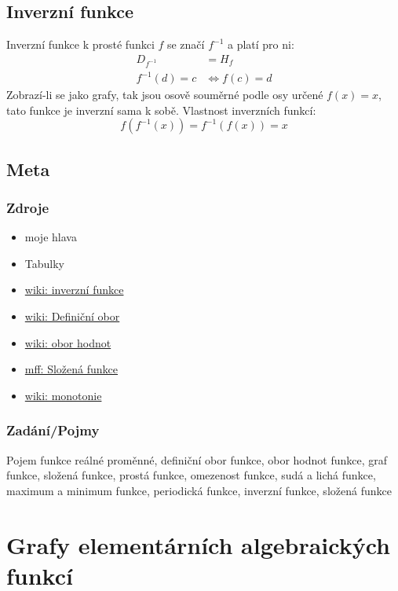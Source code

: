 \documentclass[12pt]{article}
\begin{document}
\subsection{Inverzní funkce}
Inverzní funkce k prosté funkci $f$ se značí $f^{-1}$ a platí pro ni:
\begin{align}
D_{f^{-1}} &= H_f\\
f^{-1}(d) = c &\iff f(c) = d
\end{align}
Zobrazí-li se jako grafy, tak jsou osově souměrné podle osy určené $f(x) =x$, tato funkce je inverzní sama k sobě. Vlastnost inverzních funkcí:
\begin{equation}
f(f^{-1}(x))=f^{-1}(f(x))=x
\end{equation}

\subsection{Meta}
\subsubsection{Zdroje}
\begin{itemize}
\item moje hlava
\item Tabulky
\item \href{https://cs.wikipedia.org/wiki/Inverzn\%C3\%AD_zobrazen\%C3\%AD}{wiki: inverzní funkce}
\item \href{https://cs.wikipedia.org/wiki/Defini\%C4\%8Dn\%C3\%AD_obor}{wiki: Definiční obor}
\item \href{https://cs.wikipedia.org/wiki/Obor_hodnot}{wiki: obor hodnot}
\item \href{https://www.karlin.mff.cuni.cz/~portal/funkce/?page=slozena}{mff: Složená funkce}
\item \href{https://cs.wikipedia.org/wiki/Monot\%C3\%B3nn\%C3\%AD_funkce}{wiki: monotonie}
\end{itemize}
\subsubsection{Zadání/Pojmy}
Pojem funkce reálné proměnné, definiční obor funkce, obor hodnot funkce, graf funkce, složená funkce, prostá funkce, omezenost funkce, sudá a lichá funkce, maximum a minimum funkce, periodická funkce, inverzní funkce, složená funkce
\section{Grafy elementárních algebraických funkcí}
\end{document}

